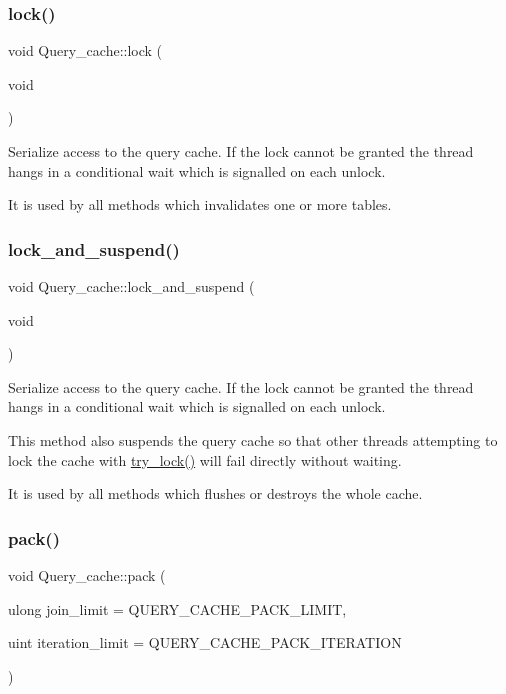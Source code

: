 \subsubsection{\texorpdfstring{lock()}{lock()}}
{\footnotesize\ttfamily void Query\+\_\+cache\+::lock (\begin{DoxyParamCaption}\item[{void}]{ }\end{DoxyParamCaption})}

Serialize access to the query cache. If the lock cannot be granted the thread hangs in a conditional wait which is signalled on each unlock.

It is used by all methods which invalidates one or more tables. \mbox{\label{classQuery__cache_ac89ccc6622e7b96b09a24ac6e43f4364}} 
\subsubsection{\texorpdfstring{lock\+\_\+and\+\_\+suspend()}{lock\_and\_suspend()}}
{\footnotesize\ttfamily void Query\+\_\+cache\+::lock\+\_\+and\+\_\+suspend (\begin{DoxyParamCaption}\item[{void}]{ }\end{DoxyParamCaption})}

Serialize access to the query cache. If the lock cannot be granted the thread hangs in a conditional wait which is signalled on each unlock.

This method also suspends the query cache so that other threads attempting to lock the cache with \mbox{\hyperlink{classQuery__cache_af6f115d2cdd660b8a92dc7943926a1ee}{try\+\_\+lock()}} will fail directly without waiting.

It is used by all methods which flushes or destroys the whole cache. \mbox{\label{classQuery__cache_a0f90dda21146e016edb908c7a74fe846}} 
\subsubsection{\texorpdfstring{pack()}{pack()}}
{\footnotesize\ttfamily void Query\+\_\+cache\+::pack (\begin{DoxyParamCaption}\item[{ulong}]{join\+\_\+limit = {\ttfamily QUERY\+\_\+CACHE\+\_\+PACK\+\_\+LIMIT},  }\item[{uint}]{iteration\+\_\+limit = {\ttfamily QUERY\+\_\+CACHE\+\_\+PACK\+\_\+ITERATION} }\end{DoxyParamCaption})}

